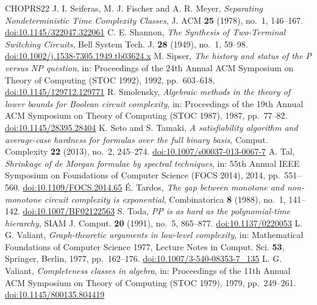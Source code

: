 \begin{thebibliography}{CHOPRS22}
 J. I. Seiferas, M. J. Fischer and A. R. Meyer, \emph{Separating Nondeterministic Time Complexity Classes}, J. ACM \textbf{25} (1978), no.~1, 146--167. \href{https://doi.org/10.1145/322047.322061}{doi:10.1145/322047.322061}
 C. E. Shannon, \emph{The Synthesis of Two-Terminal Switching Circuits}, Bell System Tech. J. \textbf{28} (1949), no.~1, 59--98. \href{https://doi.org/10.1002/j.1538-7305.1949.tb03624.x}{doi:10.1002/j.1538-7305.1949.tb03624.x}
 M. Sipser, \emph{The history and status of the P versus NP question}, in: Proceedings of the 24th Annual ACM Symposium on Theory of Computing (STOC 1992), 1992, pp.~603--618. \href{https://doi.org/10.1145/129712.129771}{doi:10.1145/129712.129771}
 R. Smolensky, \emph{Algebraic methods in the theory of lower bounds for Boolean circuit complexity}, in: Proceedings of the 19th Annual ACM Symposium on Theory of Computing (STOC 1987), 1987, pp.~77--82. \href{https://doi.org/10.1145/28395.28404}{doi:10.1145/28395.28404}
 K. Seto and S. Tamaki, \emph{A satisfiability algorithm and average-case hardness for formulas over the full binary basis}, Comput. Complexity \textbf{22} (2013), no.~2, 245--274. \href{https://doi.org/10.1007/s00037-013-0067-7}{doi:10.1007/s00037-013-0067-7}
 A. Tal, \emph{Shrinkage of de Morgan formulae by spectral techniques}, in: 55th Annual IEEE Symposium on Foundations of Computer Science (FOCS 2014), 2014, pp.~551--560. \href{https://doi.org/10.1109/FOCS.2014.65}{doi:10.1109/FOCS.2014.65}
 {\'E}. Tardos, \emph{The gap between monotone and non-monotone circuit complexity is exponential}, Combinatorica \textbf{8} (1988), no.~1, 141--142. \href{https://doi.org/10.1007/BF02122563}{doi:10.1007/BF02122563}
 S. Toda, \emph{PP is as hard as the polynomial-time hierarchy}, SIAM J. Comput. \textbf{20} (1991), no.~5, 865--877. \href{https://doi.org/10.1137/0220053}{doi:10.1137/0220053}
 L. G. Valiant, \emph{Graph-theoretic arguments in low-level complexity}, in: Mathematical Foundations of Computer Science 1977, Lecture Notes in Comput. Sci. \textbf{53}, Springer, Berlin, 1977, pp.~162--176. \href{https://doi.org/10.1007/3-540-08353-7_135}{doi:10.1007/3-540-08353-7\_135}
 L. G. Valiant, \emph{Completeness classes in algebra}, in: Proceedings of the 11th Annual ACM Symposium on Theory of Computing (STOC 1979), 1979, pp.~249--261. \href{https://doi.org/10.1145/800135.804419}{doi:10.1145/800135.804419}

\end{thebibliography}
